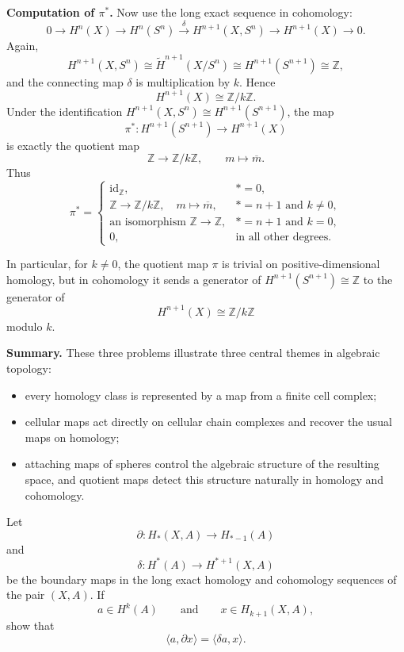 \begin{solution}
\par

\textbf{Computation of \(\pi^*\).}
Now use the long exact sequence in cohomology:
\[
0\to H^n(X)\to H^n(S^n)\xrightarrow{\delta} H^{n+1}(X,S^n)\to H^{n+1}(X)\to 0.
\]
Again,
\[
H^{n+1}(X,S^n)\cong \widetilde H^{n+1}(X/S^n)\cong H^{n+1}(S^{n+1})\cong \mathbb Z,
\]
and the connecting map \(\delta\) is multiplication by \(k\). Hence
\[
H^{n+1}(X)\cong \mathbb Z/k\mathbb Z.
\]
Under the identification \(H^{n+1}(X,S^n)\cong H^{n+1}(S^{n+1})\), the map
\[
\pi^*:H^{n+1}(S^{n+1})\to H^{n+1}(X)
\]
is exactly the quotient map
\[
\mathbb Z\to \mathbb Z/k\mathbb Z,
\qquad
m\mapsto \overline{m}.
\]
Thus
\[
\pi^*=
\begin{cases}
	\mathrm{id}_{\mathbb Z}, & *=0,\\[1mm]
	\mathbb Z\to \mathbb Z/k\mathbb Z,\quad m\mapsto \overline{m}, & *=n+1 \text{ and } k\neq 0,\\[1mm]
	\text{an isomorphism }\mathbb Z\to\mathbb Z, & *=n+1 \text{ and } k=0,\\[1mm]
	0, & \text{in all other degrees.}
\end{cases}
\]

\par

In particular, for \(k\neq 0\), the quotient map \(\pi\) is trivial on positive-dimensional homology, but in cohomology it sends a generator of \(H^{n+1}(S^{n+1})\cong \mathbb Z\) to the generator of
\[
H^{n+1}(X)\cong \mathbb Z/k\mathbb Z
\]
modulo \(k\).

\par

\noindent
\textbf{Summary.}
These three problems illustrate three central themes in algebraic topology:

\begin{itemize}
	\item every homology class is represented by a map from a finite cell complex;
	\item cellular maps act directly on cellular chain complexes and recover the usual maps on homology;
	\item attaching maps of spheres control the algebraic structure of the resulting space, and quotient maps detect this structure naturally in homology and cohomology.
\end{itemize}
\end{solution}

\begin{problem}
Let
\[
\partial : H_*(X,A)\longrightarrow H_{*-1}(A)
\]
and
\[
\delta : H^*(A)\longrightarrow H^{*+1}(X,A)
\]
be the boundary maps in the long exact homology and cohomology sequences of the pair \((X,A)\). If
\[
a\in H^k(A)
\qquad\text{and}\qquad
x\in H_{k+1}(X,A),
\]
show that
\[
\langle a,\partial x\rangle=\langle \delta a,x\rangle .
\]

\par
\end{problem}

